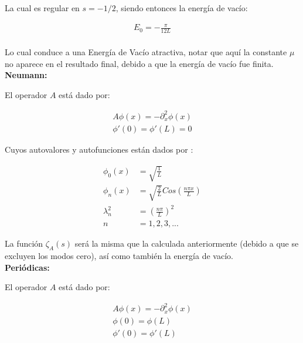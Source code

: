 La cual es regular en $s=-1/2$, siendo entonces la energía de vacío:

\begin{equation}
\begin{array}{c}
E _0 = - \frac{\pi}{12 L} \\[8pt]
\end{array}
\end{equation}

Lo cual conduce a una Energía de Vacío atractiva, notar que aquí la constante $\mu$ no aparece en el resultado final, debido a que la energía de vacío fue finita.\\

\textbf{Neumann:}

El operador $A$ está dado por:

\begin{equation}
\begin{array}{c}
	A \phi (x) = - \partial _x ^2 \phi (x) \\[10pt]
    \phi ' (0) = \phi ' (L) = 0 
\end{array}
\end{equation}



Cuyos autovalores y autofunciones están dados por  : 

\begin{equation}
\begin{aligned}
	\phi _0 (x) &= \sqrt{ \frac{1}{L} } \\[5pt]
	\phi _n (x)  &= \sqrt{\frac{2}{L}} Cos( \frac{n \pi x}{L} ) \\[5pt]
	\lambda _n ^2 &= \left( \frac{n \pi }{L} \right) ^2 \\[5pt]
	n &= 1,2,3, ...
\end{aligned}
\end{equation}



La función $\zeta _A (s)$ será la misma que la calculada anteriormente (debido a que se excluyen los modos cero), así como también la energía de vacío. \\

\textbf{Periódicas:}

El operador $A$ está dado por:

\begin{equation}
\begin{array}{c}
	A \phi (x) = - \partial _x ^2 \phi (x) \\[5pt]
    \phi (0) = \phi (L)  \\[5pt]
    \phi ' (0) = \phi ' (L)
\end{array}
\end{equation}

